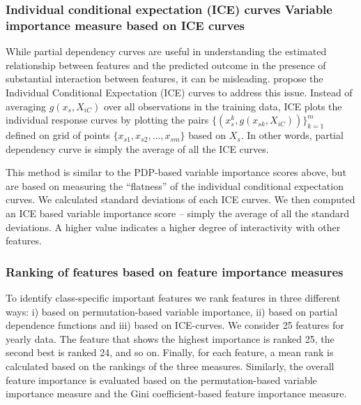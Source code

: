 \documentclass[11pt,a4paper,]{article}
\begin{document}
\hypertarget{individual-conditional-expectation-ice-curves-variable-importance-measure-based-on-ice-curves}{%
\subsubsection{Individual conditional expectation (ICE) curves Variable importance measure based on ICE curves}\label{individual-conditional-expectation-ice-curves-variable-importance-measure-based-on-ice-curves}}

While partial dependency curves are useful in understanding the estimated relationship between features and the predicted outcome in the presence of substantial interaction between features, it can be misleading. \textcite{goldstein2015peeking} propose the Individual Conditional Expectation (ICE) curves to address this issue. Instead of
averaging \(g(x_s, X_{iC})\) over all observations in the training data, ICE plots the individual response curves by plotting the pairs \(\{(x_s^k, g(x_{sk}, X_{iC}))\}_{k=1}^{m}\) defined on grid of points \(\{x_{s1}, x_{s2},\dots, x_{sm}\}\) based on \(X_s\). In other words, partial dependency curve is simply the average of all the ICE curves.

This method is similar to the PDP-based variable importance scores above, but are based on measuring the ``flatness'' of the individual conditional expectation curves. We calculated standard deviations of each ICE curves. We then computed an ICE based variable importance score -- simply the average of all the standard deviations. A higher value indicates a higher degree of interactivity with other features.

\hypertarget{ranking-of-features-based-on-feature-importance-measures}{%
\subsubsection{Ranking of features based on feature importance measures}\label{ranking-of-features-based-on-feature-importance-measures}}

To identify class-specific important features we rank features in three different ways: i) based on permutation-based variable importance, ii) based on partial dependence functions and iii) based on ICE-curves. We consider 25 features for yearly data. The feature that shows the highest importance is ranked 25, the second best is ranked 24, and so on. Finally, for each feature, a mean rank is calculated based on the rankings of the three measures. Similarly, the overall feature importance is evaluated based on the permutation-based variable importance measure and the Gini coefficient-based feature importance measure.
\end{document}
